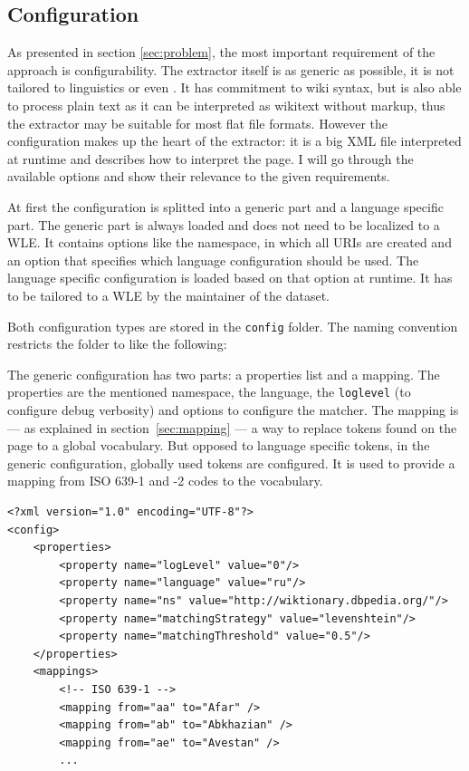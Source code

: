 \subsection{Configuration}
As presented in section \ref{sec:problem}, the most important requirement of the approach is configurability. The extractor itself is as generic as possible, it is not tailored to linguistics or even \wik. 
It has commitment to wiki syntax, but is also able to process plain text as it can be interpreted as wikitext without markup, thus the extractor may be suitable for most flat file formats. 
However the configuration makes up the heart of the extractor: it is a big XML file interpreted at runtime and describes how to interpret the page. 
I will go through the available options and show their relevance to the given requirements.

At first the configuration is splitted into a generic part and a language specific part. 
The generic part is always loaded and does not need to be localized to a WLE. 
It contains options like the namespace, in which all URIs are created and an option that specifies which language configuration should be used. 
The language specific configuration is loaded based on that option at runtime. 
It has to be tailored to a WLE by the maintainer of the dataset.

Both configuration types are stored in the \texttt{config} folder. 
The naming convention restricts the folder to like the following:

The generic configuration has two parts: a properties list and a mapping. 
The properties are the mentioned namespace, the language, the \texttt{loglevel} (to configure debug verbosity) and options to configure the matcher. 
The mapping is --- as explained in section~\ref{sec:mapping} --- a way to replace tokens found on the page to a global vocabulary. 
But opposed to language specific tokens, in the generic configuration, globally used tokens are configured. 
It is used to provide a mapping from ISO 639-1 and -2 codes to the \wik vocabulary.

\begin{lstlisting}[style=XML]
<?xml version="1.0" encoding="UTF-8"?>
<config>
    <properties>
        <property name="logLevel" value="0"/>
        <property name="language" value="ru"/>
        <property name="ns" value="http://wiktionary.dbpedia.org/"/>
        <property name="matchingStrategy" value="levenshtein"/>
        <property name="matchingThreshold" value="0.5"/>
    </properties>
    <mappings>
        <!-- ISO 639-1 -->
        <mapping from="aa" to="Afar" />
        <mapping from="ab" to="Abkhazian" />
        <mapping from="ae" to="Avestan" />
        ...
\end{lstlisting}

